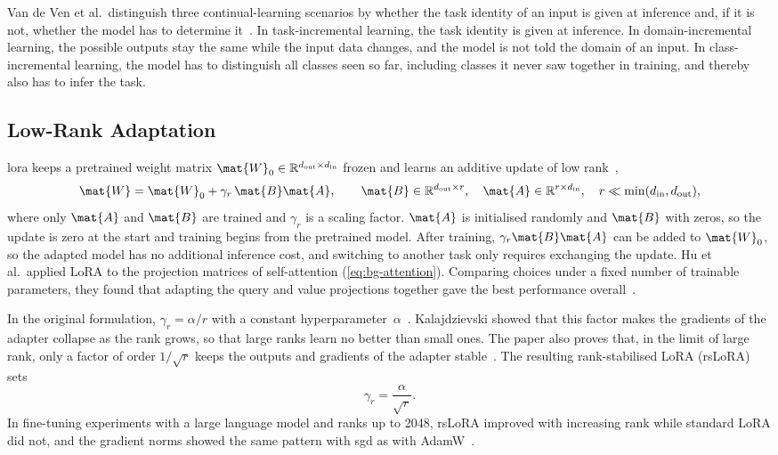 Van de Ven et al.\ distinguish three continual-learning scenarios by whether the task identity of an input is given at inference and, if it is not, whether the model has to determine it~\cite{van_de_Ven_2025}.
In task-incremental learning, the task identity is given at inference.
In domain-incremental learning, the possible outputs stay the same while the input data changes, and the model is not told the domain of an input.
In class-incremental learning, the model has to distinguish all classes seen so far, including classes it never saw together in training, and thereby also has to infer the task.

\subsection{Low-Rank Adaptation}
\label{subsec:bg-lora}

\Gls{lora} keeps a pretrained weight matrix $\mat{W}_0 \in \mathbb{R}^{d_{\mathrm{out}} \times d_{\mathrm{in}}}$ frozen and learns an additive update of low rank~\cite[Sec.~4.1]{hu2022lora},
\begin{equation}
\mat{W} = \mat{W}_0 + \gamma_r \, \mat{B}\mat{A},
\qquad \mat{B} \in \mathbb{R}^{d_{\mathrm{out}} \times r}, \quad \mat{A} \in \mathbb{R}^{r \times d_{\mathrm{in}}}, \quad r \ll \min(d_{\mathrm{in}}, d_{\mathrm{out}}),
\label{eq:bg-lora}
\end{equation}
where only $\mat{A}$ and $\mat{B}$ are trained and $\gamma_r$ is a scaling factor.
$\mat{A}$ is initialised randomly and $\mat{B}$ with zeros, so the update is zero at the start and training begins from the pretrained model.
After training, $\gamma_r\mat{B}\mat{A}$ can be added to $\mat{W}_0$, so the adapted model has no additional inference cost, and switching to another task only requires exchanging the update.
Hu et al.\ applied LoRA to the projection matrices of self-attention (\cref{eq:bg-attention}).
Comparing choices under a fixed number of trainable parameters, they found that adapting the query and value projections together gave the best performance overall~\cite[Secs.~4.2 and~7.1, Table~5]{hu2022lora}.

In the original formulation, $\gamma_r = \alpha / r$ with a constant hyperparameter~$\alpha$~\cite[Sec.~4.1]{hu2022lora}.
Kalajdzievski showed that this factor makes the gradients of the adapter collapse as the rank grows, so that large ranks learn no better than small ones.
The paper also proves that, in the limit of large rank, only a factor of order $1/\sqrt{r}$ keeps the outputs and gradients of the adapter stable~\cite[Secs.~2.1 and~3]{kalajdzievski2023rankstabilizationscalingfactor}.
The resulting rank-stabilised LoRA (rsLoRA) sets
\begin{equation}
\gamma_r = \frac{\alpha}{\sqrt{r}}.
\label{eq:bg-rslora}
\end{equation}
In fine-tuning experiments with a large language model and ranks up to 2048, rsLoRA improved with increasing rank while standard LoRA did not, and the gradient norms showed the same pattern with \gls{sgd} as with AdamW~\cite[Sec.~4]{kalajdzievski2023rankstabilizationscalingfactor}.

